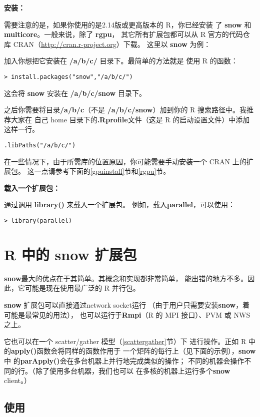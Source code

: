 {\bf 安装：}

需要注意的是，如果你使用的是2.14版或更高版本的 R，你已经安装
了 {\bf snow} 和 {\bf multicore}。一般来说，除了 {\bf rgpu}，
其它所有扩展包都可以从 R 官方的代码仓库 CRAN（\url{http://cran.r-project.org}）下载。
这里以 {\bf snow} 为例：

加入你想把它安装在 {\bf /a/b/c/} 目录下。最简单的方法就是
使用 R 的函数：

\begin{lstlisting}
> install.packages("snow","/a/b/c/")
\end{lstlisting}

这会将 {\bf snow} 安装在 {\bf /a/b/c/{\bf snow}} 目录下。

之后你需要将目录{\bf /a/b/c}（不是{\bf
/a/b/c/snow}）加到你的 R 搜索路径中。我推荐大家在
自己 home 目录下的{\bf .Rprofile}文件（这是 R 的启动设置文件）中添加这样一行。
\begin{lstlisting}
.libPaths("/a/b/c/")
\end{lstlisting}

在一些情况下，由于所需库的位置原因，你可能需要手动安装一个 CRAN 上的扩展包。
这一点请参考下面的\ref{gpuinstall}节和\ref{rgpu}节。

{\bf 载入一个扩展包：}

通过调用 {\bf library()} 来载入一个扩展包。
例如，载入{\bf parallel}，可以使用：
\begin{lstlisting}
> library(parallel)
\end{lstlisting}

\section{R 中的 snow 扩展包}
\label{snow}

{\bf snow}最大的优点在于其简单。其概念和实现都非常简单，
能出错的地方不多。因此，它可能是现在使用最广泛的 R 并行包。


{\bf snow} 扩展包可以直接通过network socket运行
（由于用户只需要安装{\bf snow}，着可能是最常见的用法），
也可以运行于{\bf Rmpi}（R 的 MPI 接口）、PVM 或 NWS之上。

它也可以在一个 scatter/gather 模型（\ref{scattergather}节）下
进行操作。正如 R 中的{\bf apply()}函数会将同样的函数作用于
一个矩阵的每行上（见下面的示例），{\bf snow}中
的{\bf parApply()}会在多台机器上并行地完成类似的操作；
不同的机器会操作不同的行。（除了使用多台机器，我们也可以
在多核的机器上运行多个{\bf snow} client。）

\subsection{使用}

